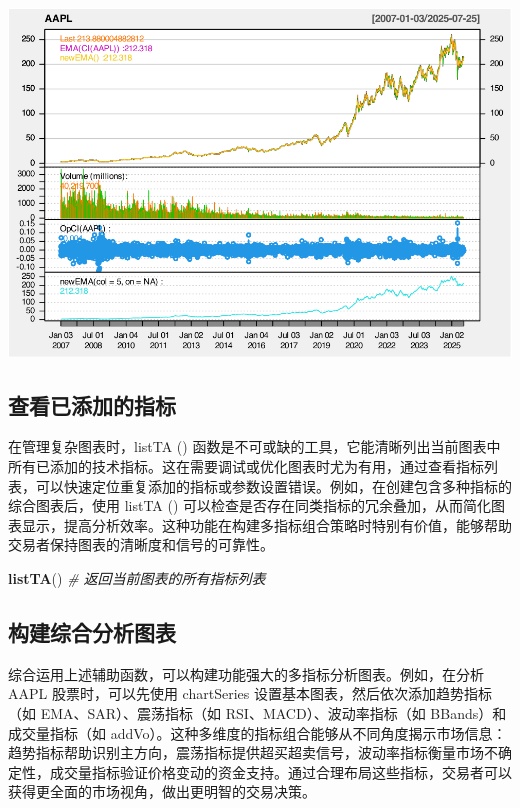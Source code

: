 \documentclass[]{ctexbook}
\newenvironment{Shaded}{\begin{snugshade}}{\end{snugshade}}
\newcommand{\CommentTok}[1]{\textcolor[rgb]{0.56,0.35,0.01}{\textit{#1}}}
\newcommand{\FunctionTok}[1]{\textcolor[rgb]{0.13,0.29,0.53}{\textbf{#1}}}
\newcommand{\NormalTok}[1]{#1}
\begin{document}
\includegraphics[width=0.9\linewidth]{QuantmodHandbook_files/figure-latex/newta-5}

\subsection{查看已添加的指标}\label{ux67e5ux770bux5df2ux6dfbux52a0ux7684ux6307ux6807}

在管理复杂图表时，listTA () 函数是不可或缺的工具，它能清晰列出当前图表中所有已添加的技术指标。这在需要调试或优化图表时尤为有用，通过查看指标列表，可以快速定位重复添加的指标或参数设置错误。例如，在创建包含多种指标的综合图表后，使用 listTA () 可以检查是否存在同类指标的冗余叠加，从而简化图表显示，提高分析效率。这种功能在构建多指标组合策略时特别有价值，能够帮助交易者保持图表的清晰度和信号的可靠性。

\begin{Shaded}
\begin{Highlighting}[]
\FunctionTok{listTA}\NormalTok{()  }\CommentTok{\# 返回当前图表的所有指标列表}
\end{Highlighting}
\end{Shaded}

\subsection{构建综合分析图表}\label{ux6784ux5efaux7efcux5408ux5206ux6790ux56feux8868}

综合运用上述辅助函数，可以构建功能强大的多指标分析图表。例如，在分析 AAPL 股票时，可以先使用 chartSeries 设置基本图表，然后依次添加趋势指标（如 EMA、SAR）、震荡指标（如 RSI、MACD）、波动率指标（如 BBands）和成交量指标（如 addVo）。这种多维度的指标组合能够从不同角度揭示市场信息：趋势指标帮助识别主方向，震荡指标提供超买超卖信号，波动率指标衡量市场不确定性，成交量指标验证价格变动的资金支持。通过合理布局这些指标，交易者可以获得更全面的市场视角，做出更明智的交易决策。
\end{document}
